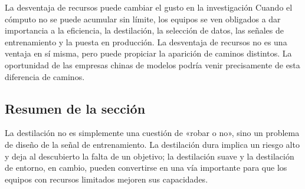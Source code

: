 \begin{knowledgebox}{La desventaja de recursos puede cambiar el gusto en la investigación}
Cuando el cómputo no se puede acumular sin límite, los equipos se ven obligados a dar importancia a la eficiencia, la destilación, la selección de datos, las señales de entrenamiento y la puesta en producción. La desventaja de recursos no es una ventaja en sí misma, pero puede propiciar la aparición de caminos distintos. La oportunidad de las empresas chinas de modelos podría venir precisamente de esta diferencia de caminos.
\end{knowledgebox}

\subsection{Resumen de la sección}

La destilación no es simplemente una cuestión de «robar o no», sino un problema de diseño de la señal de entrenamiento. La destilación dura implica un riesgo alto y deja al descubierto la falta de un objetivo; la destilación suave y la destilación de entorno, en cambio, pueden convertirse en una vía importante para que los equipos con recursos limitados mejoren sus capacidades.

